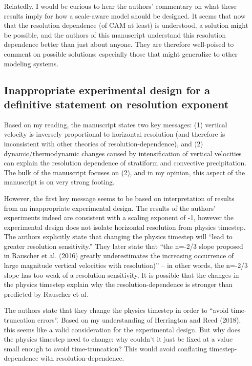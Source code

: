 \documentclass[12pt,oneside,a4paper]{article}%
\begin{document}
{\color{red}{See General Remarks.}} \newline

Relatedly, I would be curious to hear the authors’ commentary on what these
results imply for how a scale-aware model should be designed. It seems that
now that the resolution dependence (of CAM at least) is understood, a solution
might be possible, and the authors of this manuscript understand this resolution
dependence better than just about anyone. They are therefore well-poised to
comment on possible solutions: especially those that might generalize to other modeling systems. \newline

{\color{red}{Working on this.}}

\subsection*{\small Inappropriate experimental design for a definitive statement on resolution exponent}

Based on my reading, the manuscript states two key messages: (1) vertical velocity
is inversely proportional to horizontal resolution (and therefore is inconsistent
with other theories of resolution-dependence), and (2) dynamic/thermodynamic
changes caused by intensification of vertical velocities can explain the resolution
dependence of stratiform and convective precipitation. The bulk of the
manuscript focuses on (2), and in my opinion, this aspect of the manuscript is
on very strong footing. \newline

However, the first key message seems to be based on interpretation of results from
an inappropriate experimental design. The results of the authors’ experiments
indeed are consistent with a scaling exponent of -1, however the experimental
design does not isolate horizontal resolution from physics timestep. The authors
explicitly state that changing the physics timestep will “lead to greater resolution
sensitivity.” They later state that “the n=-2/3 slope proposed in Rauscher et
al. (2016) greatly underestimates the increasing occurrence of large magnitude
vertical velocities with resolution)” – in other words, the n=-2/3 slope has too
weak of a resolution sensitivity. It is possible that the changes in the physics timestep explain why the resolution-dependence is stronger than predicted by
Rauscher et al. \newline

The authors state that they change the physics timestep in order to “avoid
time-truncation errors”. Based on my understanding of Herrington and Reed
(2018), this seems like a valid consideration for the experimental design. But
why does the physics timestep need to change: why couldn’t it just be fixed
at a value small enough to avoid time-truncation? This would avoid conflating
timestep-dependence with resolution-dependence. \newline
\end{document}
